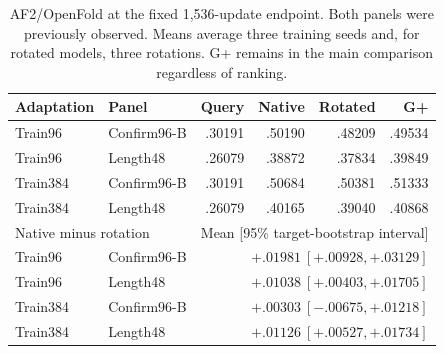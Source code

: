 \begin{table}[t]
\centering
\caption{AF2/OpenFold at the fixed 1,536-update endpoint. Both panels were previously observed. Means average three training seeds and, for rotated models, three rotations. G+ remains in the main comparison regardless of ranking.}
\label{tab:openfold}
\small\setlength{\tabcolsep}{3pt}
\begin{tabular*}{\linewidth}{@{\extracolsep{\fill}}llrrrr@{}}
\toprule
Adaptation & Panel & Query & Native & Rotated & G+ \\
\midrule
Train96 & Confirm96-B & .30191 & .50190 & .48209 & .49534 \\
Train96 & Length48 & .26079 & .38872 & .37834 & .39849 \\
Train384 & Confirm96-B & .30191 & .50684 & .50381 & .51333 \\
Train384 & Length48 & .26079 & .40165 & .39040 & .40868 \\
\midrule
\multicolumn{2}{l}{Native minus rotation} & \multicolumn{4}{r}{Mean [95\% target-bootstrap interval]} \\
Train96 & Confirm96-B & \multicolumn{4}{r}{$+.01981\ [+.00928,+.03129]$} \\
Train96 & Length48 & \multicolumn{4}{r}{$+.01038\ [+.00403,+.01705]$} \\
Train384 & Confirm96-B & \multicolumn{4}{r}{$+.00303\ [-.00675,+.01218]$} \\
Train384 & Length48 & \multicolumn{4}{r}{$+.01126\ [+.00527,+.01734]$} \\
\bottomrule
\end{tabular*}
\end{table}
